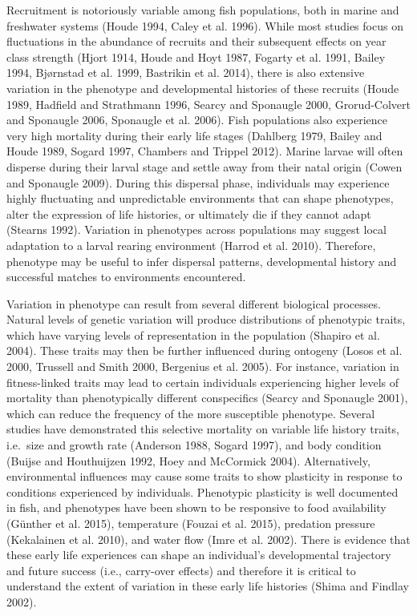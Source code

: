 \documentclass[]{book}
\begin{document}
Recruitment is notoriously variable among fish populations, both in
marine and freshwater systems (Houde 1994, Caley et al. 1996). While
most studies focus on fluctuations in the abundance of recruits and
their subsequent effects on year class strength (Hjort 1914, Houde and
Hoyt 1987, Fogarty et al. 1991, Bailey 1994, Bjørnstad et al. 1999,
Bastrikin et al. 2014), there is also extensive variation in the
phenotype and developmental histories of these recruits (Houde 1989,
Hadfield and Strathmann 1996, Searcy and Sponaugle 2000, Grorud-Colvert
and Sponaugle 2006, Sponaugle et al. 2006). Fish populations also
experience very high mortality during their early life stages (Dahlberg
1979, Bailey and Houde 1989, Sogard 1997, Chambers and Trippel 2012).
Marine larvae will often disperse during their larval stage and settle
away from their natal origin (Cowen and Sponaugle 2009). During this
dispersal phase, individuals may experience highly fluctuating and
unpredictable environments that can shape phenotypes, alter the
expression of life histories, or ultimately die if they cannot adapt
(Stearns 1992). Variation in phenotypes across populations may suggest
local adaptation to a larval rearing environment (Harrod et al. 2010).
Therefore, phenotype may be useful to infer dispersal patterns,
developmental history and successful matches to environments
encountered.

Variation in phenotype can result from several different biological
processes. Natural levels of genetic variation will produce
distributions of phenotypic traits, which have varying levels of
representation in the population (Shapiro et al. 2004). These traits may
then be further influenced during ontogeny (Losos et al. 2000, Trussell
and Smith 2000, Bergenius et al. 2005). For instance, variation in
fitness-linked traits may lead to certain individuals experiencing
higher levels of mortality than phenotypically different conspecifics
(Searcy and Sponaugle 2001), which can reduce the frequency of the more
susceptible phenotype. Several studies have demonstrated this selective
mortality on variable life history traits, i.e.~size and growth rate
(Anderson 1988, Sogard 1997), and body condition (Buijse and Houthuijzen
1992, Hoey and McCormick 2004). Alternatively, environmental influences
may cause some traits to show plasticity in response to conditions
experienced by individuals. Phenotypic plasticity is well documented in
fish, and phenotypes have been shown to be responsive to food
availability (Günther et al. 2015), temperature (Fouzai et al. 2015),
predation pressure (Kekalainen et al. 2010), and water flow (Imre et al.
2002). There is evidence that these early life experiences can shape an
individual's developmental trajectory and future success (i.e.,
carry-over effects) and therefore it is critical to understand the
extent of variation in these early life histories (Shima and Findlay
2002).
\end{document}
